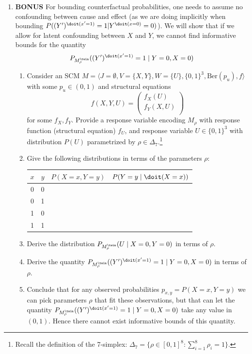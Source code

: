 \begin{enumerate}[label=12.\arabic*]
	\item \textbf{BONUS}
	For bounding counterfactual probabilities, one needs to assume no confounding between cause and effect (as we are doing implicitly when bounding $P((Y')^{\doit(x'=1)}=1 | Y^{\doit(x=0)}=0)$).
	We will show that if we allow for latent confounding between $X$ and $Y$, we cannot find informative bounds for the quantity
	$$P_{M_{\rho}^{\twin}}((Y')^{\doit(x'=1)}=1\mid Y=0,X=0)$$
	\begin{enumerate}
		\item Consider an SCM $M=\langle J=\emptyset, V = \{X, Y\}, W=\{U\}, \{0,1\}^3, \textrm{Ber}(p_u), f\rangle$ with some $p_u \in (0,1)$ and structural equations
		$$f(X, Y, U) = \begin{pmatrix}
				f_X(U)   \\
				f_Y(X,U) \\
			\end{pmatrix}$$ for some $f_X, f_Y$. Provide a response variable encoding $M_\rho$ with response function (structural equation) $f_U$, and response variable $U \in \{0,1\}^3$ with distribution $P(U)$ parametrized by $\rho \in \Delta_7$.\footnote{Recall the definition of the 7-simplex: $\Delta_7 = \{\rho \in [0,1]^8 : \sum_{i=1}^8 \rho_i = 1\}$.}
		\item Give the following distributions in terms of the parameters $\rho$:
		\begin{center}\begin{tabular}{ccll}
				$x$ & $y$ & $P(X=x, Y=y)$ & $P(Y=y\mid \doit(X=x))$ \\
				\hline
				0   & 0   &               &                         \\
				0   & 1   &               &                         \\
				1   & 0   &               &                         \\
				1   & 1   &               &
			\end{tabular}\end{center}
		\item Derive the distribution $P_{M_{\rho}^{\twin}}(U \mid X=0,Y=0)$ in terms of $\rho$.
		\item Derive the quantity $P_{M_{\rho}^{\twin}}((Y')^{\doit(x'=1)}=1\mid Y=0,X=0)$ in terms of $\rho$.
		\item Conclude that for any observed probabilities $p_{x,y} = P(X=x, Y=y)$ we can pick parameters $\rho$ that fit these observations, but that can let the quantity $P_{M_{\rho}^{\twin}}((Y')^{\doit(x'=1)}=1\mid Y=0,X=0)$ take any value in $(0,1)$. Hence there cannot exist informative bounds of this quantity.
	\end{enumerate}


\end{enumerate}
